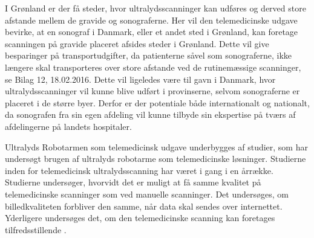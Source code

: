 I Grønland er der få steder, hvor ultralydsscanninger kan udføres og derved store afstande mellem de gravide og sonograferne. Her vil den telemedicinske udgave bevirke, at en sonograf i Danmark, eller et andet sted i Grønland, kan foretage scanningen på gravide placeret afsides steder i Grønland. Dette vil give besparinger på transportudgifter, da patienterne såvel som sonograferne, ikke længere skal transporteres over store afstande ved de rutinemæssige scanninger, se Bilag 12, 18.02.2016. 
Dette vil ligeledes være til gavn i Danmark, hvor ultralydsscanninger vil kunne blive udført i provinserne, selvom sonograferne er placeret i de større byer. Derfor er der potentiale både internationalt og nationalt, da sonografen fra sin egen afdeling vil kunne tilbyde sin ekspertise på tværs af afdelingerne på landets hospitaler. 

Ultralyds Robotarmen som telemedicinsk udgave underbygges af studier, som har undersøgt brugen af ultralyds robotarme som telemedicinske løsninger. Studierne inden for telemedicinsk ultralydsscanning har været i gang i en årrække. Studierne undersøger, hvorvidt det er muligt at få samme kvalitet på telemedicinske scanninger som ved manuelle scanninger. Det undersøges, om billedkvaliteten forbliver den samme, når data skal sendes over internettet. Yderligere undersøges det, om den telemedicinske scanning kan foretages tilfredsstillende \cite{8}\cite{5}\cite{18}\cite{Hjerterobot}. 





